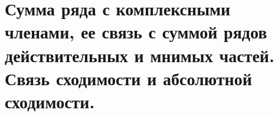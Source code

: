 {
	\section{ Сумма ряда с комплексными членами, ее связь с суммой рядов действительных и мнимых частей. Связь
	сходимости и абсолютной сходимости.}

	\newpage
}